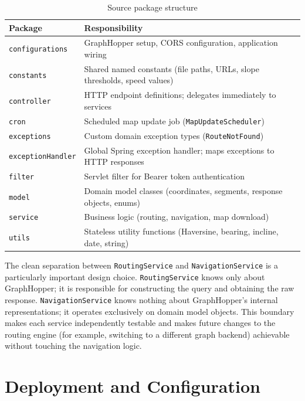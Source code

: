 \documentclass[12pt, a4paper]{report}
\begin{document}
\begin{table}[H]
\centering
\caption{Source package structure}
\label{tab:structure}
\begin{tabularx}{\textwidth}{@{}lX@{}}
\toprule
\textbf{Package} & \textbf{Responsibility} \\
\midrule
\texttt{configurations} & GraphHopper setup, CORS configuration, application wiring \\
\texttt{constants} & Shared named constants (file paths, URLs, slope thresholds, speed values) \\
\texttt{controller} & HTTP endpoint definitions; delegates immediately to services \\
\texttt{cron} & Scheduled map update job (\texttt{MapUpdateScheduler}) \\
\texttt{exceptions} & Custom domain exception types (\texttt{RouteNotFound}) \\
\texttt{exceptionHandler} & Global Spring exception handler; maps exceptions to HTTP responses \\
\texttt{filter} & Servlet filter for Bearer token authentication \\
\texttt{model} & Domain model classes (coordinates, segments, response objects, enums) \\
\texttt{service} & Business logic (routing, navigation, map download) \\
\texttt{utils} & Stateless utility functions (Haversine, bearing, incline, date, string) \\
\bottomrule
\end{tabularx}
\end{table}

The clean separation between \texttt{RoutingService} and \texttt{NavigationService} is a particularly important design choice. \texttt{RoutingService} knows only about GraphHopper; it is responsible for constructing the query and obtaining the raw response. \texttt{NavigationService} knows nothing about GraphHopper's internal representations; it operates exclusively on domain model objects. This boundary makes each service independently testable and makes future changes to the routing engine (for example, switching to a different graph backend) achievable without touching the navigation logic.

\section{Deployment and Configuration}
\label{sec:deployment}
\end{document}
